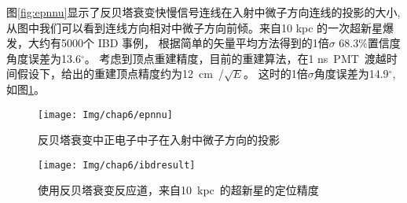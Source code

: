 图\ref{fig:epnnu}显示了反贝塔衰变快慢信号连线在入射中微子方向连线的投影的大小,从图中我们可以看到连线方向相对中微子方向前倾。来自10 kpc 的一次超新星爆发，大约有5000个 IBD 事例， 根据简单的矢量平均方法得到的1倍$\sigma$ 68.3\%置信度角度误差为13.6$^\circ$。 考虑到顶点重建精度，目前的重建算法，在1 ns~PMT~渡越时间假设下，给出的重建顶点精度约为12~cm~/$\sqrt{E}$。 这时的1倍$\sigma$角度误差为14.9$^\circ$, 如图\ref{fig:ibdf}。


\begin{figure}[!htbp]
\begin{minipage}[t]{0.48\linewidth}
  \centering
   \texttt{[image: Img/chap6/epnnu]}
    \caption{ 反贝塔衰变中正电子中子在入射中微子方向的投影}
  \label{fig:epnnu}
  \end{minipage}
 \quad\quad
  \begin{minipage}[t]{0.48\linewidth}
  \centering
   \texttt{[image: Img/chap6/ibdresult]}
    \caption{使用反贝塔衰变反应道，来自10~kpc~的超新星的定位精度}
  \label{fig:ibdf}
    \end{minipage}
\end{figure}



